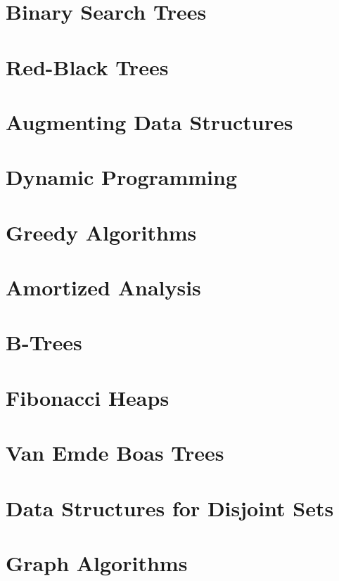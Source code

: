 \documentclass{book}
\begin{document}
\chapter{Binary Search Trees}

\chapter{Red-Black Trees}

\chapter{Augmenting Data Structures}

\chapter{Dynamic Programming}

\chapter{Greedy Algorithms}

\chapter{Amortized Analysis}

\chapter{B-Trees}

\chapter{Fibonacci Heaps}

\chapter{Van Emde Boas Trees}

\chapter{Data Structures for Disjoint Sets}

\chapter{Graph Algorithms}
\end{document}
